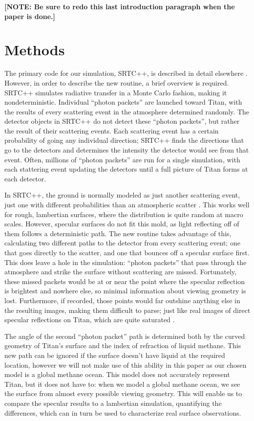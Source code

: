 \documentclass[twocolumn,linenumbers]{aastex631}
\begin{document}
\textbf{\color{red} [NOTE: Be sure to redo this last introduction paragraph when the paper is done.] \color{black}}

\section{Methods} \label{sec:methods}

The primary code for our simulation, SRTC++, is described in detail elsewhere \citep{Barnes2018}. However, in order to describe the new routine, a brief overview is required. SRTC++ simulates radiative transfer in a Monte Carlo fashion, making it nondeterministic. Individual ``photon packets'' are launched toward Titan, with the results of every scattering event in the atmosphere determined randomly. The detector objects in SRTC++ do not detect these ``photon packets'', but rather the result of their scattering events. Each scattering event has a certain probability of going any individual direction; SRTC++ finds the directions that go to the detectors and determines the intensity the detector would see from that event. Often, millions of ``photon packets'' are run for a single simulation, with each stattering event updating the detectors until a full picture of Titan forms at each detector.

In SRTC++, the ground is normally modeled as just another scattering event, just one with different probabilities than an atmospheric scatter \citep{Barnes2018}. This works well for rough, lambertian surfaces, where the distribution is quite random at macro scales. However, specular surfaces do not fit this mold, as light reflecting off of them follows a deterministic path.  The new routine takes advantage of this, calculating two different paths to the detector from every scattering event; one that goes directly to the scatter, and one that bounces off a specular surface first. This does leave a hole in the simulation: ``photon packets'' that pass through the atmosphere and strike the surface without scattering are missed. Fortunately, these missed packets would be at or near the point where the specular reflection is brightest and nowhere else, so minimal information about viewing geometry is lost. Furthermore, if recorded, those points would far outshine anything else in the resulting images, making them difficult to parse; just like real images of direct specular reflections on Titan, which are quite saturated \citep{Barnes2013}.

The angle of the second ``photon packet'' path is determined both by the curved geometry of Titan's surface and the index of refraction of liquid methane. This new path can be ignored if the surface doesn't have liquid at the required location, however we will not make use of this ability in this paper as our chosen model is a global methane ocean. This model does not accurately represent Titan, but it does not have to: when we model a global methane ocean, we see the surface from almost every possible viewing geometry. This will enable us to compare the specular results to a lambertian simulation, quantifying the differences, which can in turn be used to characterize real surface observations. 
\end{document}
